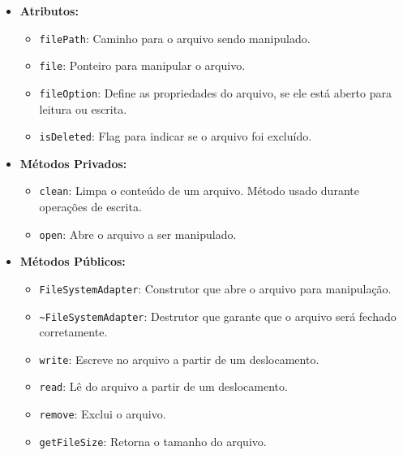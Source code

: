 \documentclass[
    12pt,				%
    oneside,   	        %
    a4paper,			%
    english,			%
    french,				%
    spanish,			%
    brazil,				%
    ]{pacotes/abntex2}
\begin{document}
\begin{itemize}
    \item \textbf{Atributos:}
        \begin{itemize}
            \item \texttt{filePath}: Caminho para o arquivo sendo manipulado.
            \item \texttt{file}: Ponteiro para manipular o arquivo.
            \item \texttt{fileOption}: Define as propriedades do arquivo, se ele está aberto para leitura ou escrita.
            \item \texttt{isDeleted}: Flag para indicar se o arquivo foi excluído.
        \end{itemize}
    \item \textbf{M\'etodos Privados:}
        \begin{itemize}
            \item \texttt{clean}: Limpa o conteúdo de um arquivo. Método usado durante operações de escrita.
            
            \item \texttt{open}: Abre o arquivo a ser manipulado.
        \end{itemize}
    \item \textbf{Métodos Públicos:}
        \begin{itemize}
            \item \texttt{FileSystemAdapter}: Construtor que abre o arquivo para manipulação.

            \item \texttt{\textasciitilde FileSystemAdapter}: Destrutor que garante que o arquivo será fechado corretamente.
            
            \item \texttt{write}: Escreve no arquivo a partir de um deslocamento.
            \item \texttt{read}: Lê do arquivo a partir de um deslocamento.
            \item \texttt{remove}: Exclui o arquivo.
            \item \texttt{getFileSize}: Retorna o tamanho do arquivo.
        \end{itemize}
\end{itemize}
\end{document}
